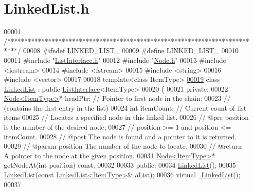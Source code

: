 \hypertarget{LinkedList_8h_source}{}\section{Linked\+List.\+h}

\begin{DoxyCode}
00001 \textcolor{comment}{/***************************************************************************/}
00008 \textcolor{preprocessor}{#ifndef LINKED\_LIST\_}
00009 \textcolor{preprocessor}{#define LINKED\_LIST\_}
00010 
00011 \textcolor{preprocessor}{#include "\hyperlink{ListInterface_8h}{ListInterface.h}"}
00012 \textcolor{preprocessor}{#include "\hyperlink{Node_8h}{Node.h}"}
00013 \textcolor{preprocessor}{#include <iostream>}
00014 \textcolor{preprocessor}{#include <fstream>}
00015 \textcolor{preprocessor}{#include <string>}
00016 \textcolor{preprocessor}{#include <vector>}
00017 
00018 \textcolor{keyword}{template}<\textcolor{keyword}{class} ItemType>
\hyperlink{classLinkedList}{00019} \textcolor{keyword}{class }\hyperlink{classLinkedList}{LinkedList} : \textcolor{keyword}{public} \hyperlink{classListInterface}{ListInterface}<ItemType>
00020 \{
00021 \textcolor{keyword}{private}:
00022    \hyperlink{classNode}{Node<ItemType>}* headPtr; \textcolor{comment}{// Pointer to first node in the chain;}
00023    \textcolor{comment}{// (contains the first entry in the list)}
00024    \textcolor{keywordtype}{int} itemCount; \textcolor{comment}{// Current count of list items   }
00025    \textcolor{comment}{// Locates a specified node in this linked list.}
00026    \textcolor{comment}{// @pre  position is the number of the desired node;}
00027    \textcolor{comment}{//       position >= 1 and position <= itemCount.}
00028    \textcolor{comment}{// @post  The node is found and a pointer to it is returned.}
00029    \textcolor{comment}{// @param position  The number of the node to locate.}
00030    \textcolor{comment}{// @return  A pointer to the node at the given position.}
00031    \hyperlink{classNode}{Node<ItemType>}* getNodeAt(\textcolor{keywordtype}{int} position) \textcolor{keyword}{const};
00032    
00033 \textcolor{keyword}{public}:
00034    \hyperlink{classLinkedList_adf8d8164e06b6d358a36df7e53e814ee}{LinkedList}();
00035    \hyperlink{classLinkedList_adf8d8164e06b6d358a36df7e53e814ee}{LinkedList}(\textcolor{keyword}{const} \hyperlink{classLinkedList}{LinkedList<ItemType>}& aList);
00036    \textcolor{keyword}{virtual} \hyperlink{classLinkedList_a66aee17d756fe0e002375897383c180b}{~LinkedList}();
00037 

\end{DoxyCode}
